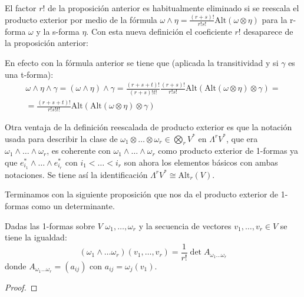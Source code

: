 \documentclass[../VD.tex]{subfiles}
\begin{document}
\begin{remark}
  El factor \(r!\) de la proposición anterior es habitualmente eliminado si se
  reescala el producto exterior por medio de la fórmula
  \(\omega\wedge\eta=\frac{(r+s)!}{r!s!}\text{Alt}(\omega\otimes\eta)\) para la
  r-forma \(\omega\) y la s-forma \(\eta\). Con esta nueva definición el
  coeficiente \(r!\) desaparece de la proposición anterior:

  En efecto con la fórmula anterior se tiene que (aplicada la transitividad y si
  \(\gamma\) es una t-forma): 
  \[\begin{array}{c}
      \omega\wedge\eta\wedge\gamma=(\omega\wedge\eta)\wedge\gamma=
      \frac{(r+s+t)!}{(r+s)!t!}\frac{(r+s)!}{r!s!}\text{Alt}
      (\text{Alt}(\omega\otimes\eta)\otimes\gamma)= \\
      =\frac{(r+s+t)!}{r!s!t!}\text{Alt}(\text{Alt}(\omega\otimes\eta)\otimes\gamma)
    \end{array}\]
\end{remark}

\begin{remark}
  Otra ventaja de la definición reescalada de producto exterior es que la
  notación usada para describir la clase de
  \(\omega_{1}\otimes\dots\otimes\omega_{r}\in\bigotimes_{r}V^{*}\) en
  \(\Lambda^{r}V^{*}\), que era \(\omega_{1}\wedge\dots\wedge\omega_{r}\), es
  coherente con \(\omega_{1}\wedge\dots\wedge\omega_{r}\) como producto exterior
  de 1-formas ya que \(e_{i_{1}}^{*}\wedge\dots\wedge e_{i_{r}}^{*}\) con
  \(i_{1}<\dots<i_{r}\) son ahora los elementos básicos con ambas notaciones. Se
  tiene así la identificación \(\Lambda^{r}V^{*}\cong\text{Alt}_{r}(V)\). 
\end{remark}

Terminamos con la siguiente proposición que nos da el producto exterior de
1-formas como un determinante.

\begin{proposition}
  Dadas las 1-formas sobre \(V\) \(\omega_{1},\dots,\omega_{r}\) y la secuencia
  de vectores \(v_{1},\dots,v_{r}\in V\) se tiene la igualdad:
  \[
    (\omega_{1}\wedge\dots\omega_{r})(v_{1},\dots,v_{r})=
    \frac{1}{r!}\det{A_{\omega_{1}\dots\omega_{r}}}
  \]
  donde \(A_{\omega_{1}\dots\omega_{r}}=(a_{ij})\) con \(a_{ij}=\omega_{j}(v_{1})\).
\end{proposition}

\begin{proof}
  
\end{proof}
\end{document}
